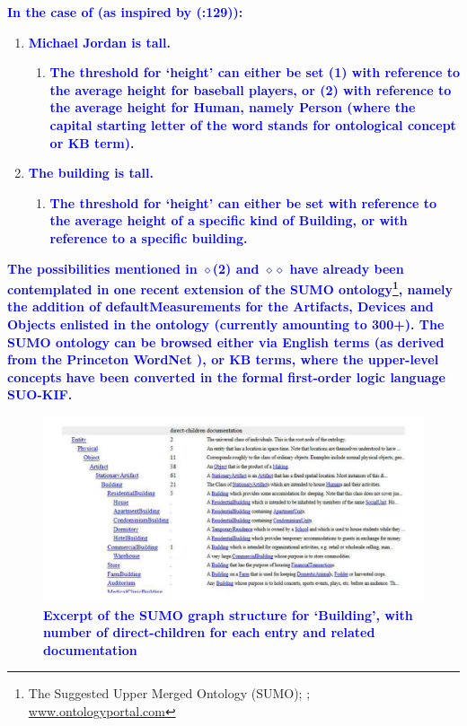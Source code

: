 \documentclass[11pt]{article}
\begin{document}
\textbf{\textcolor{blue}{In the case of (as inspired by (\cite{kennedy1999scalar}:129)):}}

\begin{enumerate}[resume]
\item \textbf{\textcolor{blue}{Michael Jordan is tall. \label{ex:jordan}}}
\begin{enumerate}[label=$\diamond$]
\item \textbf{\textcolor{blue}{The threshold for `height' can either be set (1) with reference to the average height for baseball players, or (2) with reference to the average height for Human, namely Person (where the capital starting letter of the word stands for ontological concept or KB term).}}
\end{enumerate}
\item \textbf{\textcolor{blue}{The building is tall. \label{ex:building}}}
\begin{enumerate}[label=$\diamond$$\diamond$]
\item \textbf{\textcolor{blue}{The threshold for `height' can either be set with reference to the average height of a specific kind of Building, or with reference to a specific building.}}
\end{enumerate}
\end{enumerate}

\textbf{\textcolor{blue}{The possibilities mentioned in $\diamond$(2) and $\diamond$$\diamond$ have already been contemplated in one recent extension of the SUMO ontology\footnote{The Suggested Upper Merged Ontology (SUMO); \cite{nilespease2001sumo}; \url{www.ontologyportal.com}}, namely the addition of defaultMeasurements for the Artifacts, Devices and Objects enlisted in the ontology (currently amounting to 300+). The SUMO ontology can be browsed either via English terms (as derived from the Princeton WordNet \textregistered), or KB terms, where the upper-level concepts have been converted in the formal first-order logic language SUO-KIF.}}


\begin{figure}[ht!]
\includegraphics[width=\textwidth]{building_SUMO1}
\caption{\textbf{\textcolor{blue}{Excerpt of the SUMO graph structure for `Building', with number of direct-children for each entry and related documentation}}}\label{building_SUMO}
\end{figure}
\end{document}

